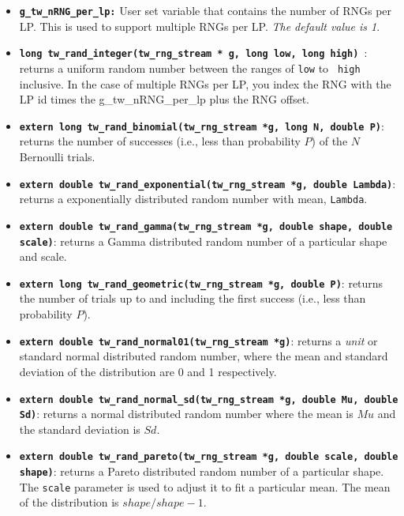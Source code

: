 \documentclass[12pt]{article}
\begin{document}
\begin{itemize}
\item {\tt\bf g\_tw\_nRNG\_per\_lp:} User set variable that contains
the number of RNGs per LP. This is used to support multiple
RNGs per LP. {\em The default value is 1}.

\item {\tt\bf long tw\_rand\_integer(tw\_rng\_stream * g, long low, long high)
}: returns a uniform random number between the ranges of {\tt low} to {\tt
  high} inclusive. In the case of multiple RNGs per LP, you index the RNG with
  the LP id times the g\_tw\_nRNG\_per\_lp plus the RNG offset.

\item {\tt\bf extern long tw\_rand\_binomial(tw\_rng\_stream *g, long N,
double P)}: returns the number of successes (i.e., less than
probability $P$) of the $N$ Bernoulli trials.

\item {\tt\bf extern double tw\_rand\_exponential(tw\_rng\_stream *g,
double Lambda)}: returns a exponentially distributed random number
with mean, {\tt Lambda}.

\item {\tt\bf extern double tw\_rand\_gamma(tw\_rng\_stream *g, double
shape, double scale)}: returns a Gamma distributed random number of a
particular shape and scale.

\item {\tt\bf extern long tw\_rand\_geometric(tw\_rng\_stream *g, double P)}:
returns the number of trials up to and including the first success (i.e.,
less than probability $P$).

\item {\tt\bf extern double tw\_rand\_normal01(tw\_rng\_stream *g)}:
returns a {\em unit} or standard normal distributed random number,
where the mean and standard deviation of the distribution are 0 and 1
respectively.

\item {\tt\bf extern double tw\_rand\_normal\_sd(tw\_rng\_stream *g,
double Mu, double Sd)}: returns a normal distributed random number
where the mean is $Mu$ and the standard deviation is $Sd$.

\item {\tt\bf extern double tw\_rand\_pareto(tw\_rng\_stream *g, double
scale, double shape)}: returns a Pareto distributed random number of a
particular shape. The {\tt scale} parameter is used to adjust it to
fit a particular mean. The mean of the distribution is
$shape/shape-1$.


\end{itemize}
\end{document}
